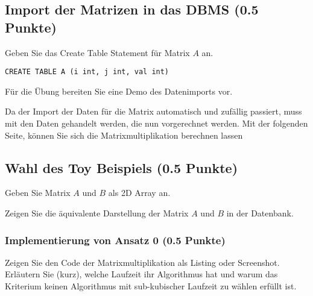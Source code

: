 \documentclass[11pt]{scrartcl}
\begin{document}
\subsection*{Import der Matrizen in das DBMS (0.5 Punkte)}

Geben Sie das Create Table Statement für Matrix $A$ an.

\begin{lstlisting}[style=dmrsql]
  CREATE TABLE A (i int, j int, val int)
\end{lstlisting}

Für die Übung bereiten Sie eine Demo des Datenimports vor.

Da der Import der Daten für die Matrix automatisch und zufällig passiert, muss mit den Daten gehandelt werden, die nun vorgerechnet werden. 
Mit der folgenden Seite, können Sie sich die Matrixmultiplikation berechnen lassen %


\subsection*{Wahl des Toy Beispiels (0.5 Punkte)}

Geben Sie Matrix $A$ und $B$ als 2D Array an.


Zeigen Sie die äquivalente Darstellung der Matrix $A$ und $B$ in der Datenbank.


\subsubsection*{Implementierung von Ansatz 0 (0.5 Punkte)}

Zeigen Sie den Code der Matrixmultiplikation als Listing oder Screenshot.
Erläutern Sie (kurz), welche Laufzeit ihr Algorithmus hat und warum das Kriterium keinen Algorithmus mit sub-kubischer Laufzeit zu wählen erfüllt ist.
\end{document}

